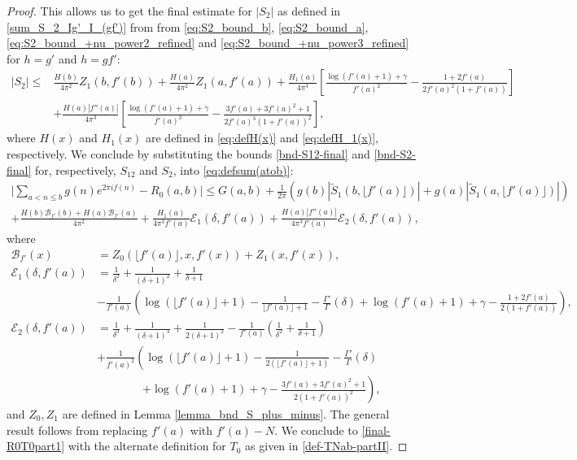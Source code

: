 \documentclass[11pt,letterpaper,oneside,reqno]{amsart}
\renewcommand{\^}[1]{\widehat{#1}}
\numberwithin{equation}{section}
\theoremstyle{remark}
\begin{document}
\begin{proof}
\smallskip
This allows us to get the final estimate for $|S_2|$ as defined in \eqref{sum_S_2_Ig'_I_(gf')} from from \eqref{eq:S2_bound_b}, \eqref{eq:S2_bound_a}, \eqref{eq:S2_bound_+nu_power2_refined} and \eqref{eq:S2_bound_+nu_power3_refined} for $h=g'$ and $h=gf'$:
\begin{equation}
\label{bnd-S2-final}
\begin{split}
    |S_2| \leq
    & \frac{H(b)}{4\pi^2 }Z_1(b,f'(b))+\frac{H(a)}{4\pi^2 }Z_1(a,f'(a))
    + \frac{H_1(a)}{4\pi^3} \left[ \frac{\log(f'(a)+1)+\gamma}{f'(a)^2} - \frac{1+2f'(a)}{2f'(a)^2(1+f'(a))} \right]
    \\& + \frac{H(a)|f''(a)|}{4\pi^3} \left[ \frac{\log(f'(a)+1)+\gamma}{f'(a)^3} - \frac{3f'(a)+3f'(a)^2+1}{2f'(a)^3(1+f'(a))^2} \right], 
\end{split}
\end{equation}
where $H(x)$ and $H_1(x)$ are defined in \eqref{eq:defH(x)} and \eqref{eq:defH_1(x)}, respectively.
%
We conclude by substituting the bounds \eqref{bnd-S12-final} and \eqref{bnd-S2-final} for, respectively, $S_{12}$ and $S_{2}$, into \eqref{eq:defsum(atob)}:
\begin{multline}
    \bigg| \sum_{a<n \leq b} g(n) e^{2\pi i f(n)} - R_0(a,b)\bigg| \leq G(a,b)
    + \frac{1}{2\pi} \left( g(b) |\tilde{S}_1(b, \lfloor f'(a) \rfloor)| + g(a)|\tilde{S}_1(a, \lfloor f'(a) \rfloor)| \right) \\
+\frac{H(b)\mathcal{B}_{f'}(b) + H(a)\mathcal{B}_{f'}(a)}{4\pi^2}
    + \frac{H_1(a)}{4\pi^3f'(a)} \mathcal{E}_1(\delta, f'(a))+\frac{H(a)|f''(a)|}{4\pi^3f'(a)} \mathcal{E}_2(\delta, f'(a)), \label{Final_Explicit_Bound}
\end{multline}
where
\begin{align}
    \mathcal{B}_{f'}(x) &= Z_0(\lfloor f'(a) \rfloor, x, f'(x)) + Z_1(x, f'(x)), \label{def-B} \\
    \mathcal{E}_1(\delta, f'(a)) &= \frac{1}{\delta^2} + \frac{1}{(\delta+1)^2} + \frac{1}{\delta+1} \nonumber \\& - \frac{1}{f'(a)} \left( \log(\lfloor f'(a) \rfloor+1) - \frac{1}{\lfloor f'(a) \rfloor+1} - \frac{\Gamma'}{\Gamma}(\delta)  + \log(f'(a)+1)+\gamma- \frac{1+2f'(a)}{2(1+f'(a))}\right) , \label{auxilliary_error1} \\
    \mathcal{E}_2(\delta, f'(a)) &= \frac{1}{\delta^3} + \frac{1}{(\delta+1)^3} + \frac{1}{2(\delta+1)^2} - \frac{1}{f'(a)} \left( \frac{1}{\delta^2} + \frac{1}{\delta+1} \right) \nonumber \\  & + \frac{1}{f'(a)^2}\left(\log(\lfloor f'(a) \rfloor+1) - \frac{1}{2(\lfloor f'(a) \rfloor+1)} - \frac{\Gamma'}{\Gamma}(\delta)\right. \nonumber\\
    &\qquad \qquad\left.+\log(f'(a)+1)+\gamma- \frac{3f'(a)+3f'(a)^2+1}{2(1+f'(a))^2}\right), \label{auxillary_error2}
\end{align}
and $Z_0, Z_1$ are defined in Lemma \ref{lemma_bnd_S_plus_minus}.
The general result follows from replacing ${f'(a)}$ with ${f'(a)}-N$.
We conclude to \eqref{final-R0T0part1} with the alternate definition for $T_0$ as given in \eqref{def-TNab-partII}.
\end{proof}
%
\end{document}
